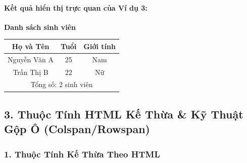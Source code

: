 \documentclass[11pt,oneside]{book}
\renewcommand{\arraystretch}{1.2}
\begin{document}
\paragraph{\textbf{Kết quả hiển thị trực quan của Ví dụ 3:}}
\begin{prettyTableBox}[Kết Quả Hiển Thị Bảng Semantics Trong Trình Duyệt (border="1")]
\centering
\vspace{4pt}
{\sffamily\bfseries\color{darkText} Danh sách sinh viên}\\[6pt]
\bgroup
\renewcommand{\arraystretch}{1.4}
\setlength{\tabcolsep}{14pt}
\begin{tabular}{|c|c|c|}
\hline
\textbf{Họ và Tên} & \textbf{Tuổi} & \textbf{Giới tính} \\
\hline
Nguyễn Văn A & 25 & Nam \\
\hline
Trần Thị B & 22 & Nữ \\
\hline
\multicolumn{3}{|c|}{Tổng số: 2 sinh viên} \\
\hline
\end{tabular}
\egroup
\vspace{4pt}
\end{prettyTableBox}

\subsection{3. Thuộc Tính HTML Kế Thừa \& Kỹ Thuật Gộp Ô (Colspan/Rowspan)}

\subsubsection{1. Thuộc Tính Kế Thừa Theo HTML}
\end{document}
